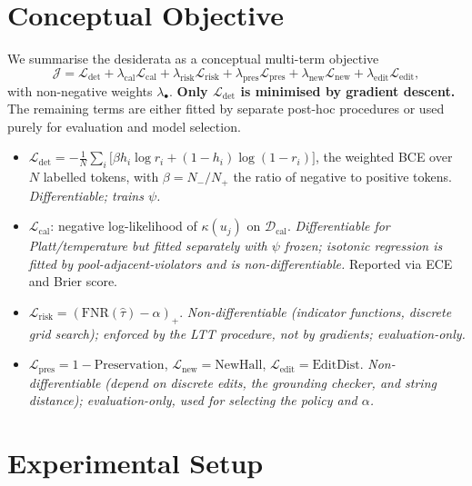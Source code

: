 \documentclass[11pt]{article}
\begin{document}
\section{Conceptual Objective}
\label{sec:loss}
We summarise the desiderata as a conceptual multi-term objective
\begin{equation}
\mathcal J = \mathcal L_{\text{det}} + \lambda_{\text{cal}}\mathcal L_{\text{cal}} + \lambda_{\text{risk}}\mathcal L_{\text{risk}} + \lambda_{\text{pres}}\mathcal L_{\text{pres}} + \lambda_{\text{new}}\mathcal L_{\text{new}} + \lambda_{\text{edit}}\mathcal L_{\text{edit}},
\end{equation}
with non-negative weights $\lambda_\bullet$. \textbf{Only $\mathcal L_{\text{det}}$ is minimised by gradient descent.} The remaining terms are either fitted by separate post-hoc procedures or used purely for evaluation and model selection.
\begin{itemize}
\item $\mathcal L_{\text{det}} = -\frac{1}{N}\sum_i \big[\beta h_i\log r_i + (1-h_i)\log(1-r_i)\big]$, the weighted BCE over $N$ labelled tokens, with $\beta = N_-/N_+$ the ratio of negative to positive tokens. \emph{Differentiable; trains $\psi$.}
\item $\mathcal L_{\text{cal}}$: negative log-likelihood of $\kappa(u_j)$ on $\mathcal D_{\text{cal}}$. \emph{Differentiable for Platt/temperature but fitted separately with $\psi$ frozen; isotonic regression is fitted by pool-adjacent-violators and is non-differentiable.} Reported via ECE and Brier score.
\item $\mathcal L_{\text{risk}} = (\mathrm{FNR}(\hat\tau)-\alpha)_+$. \emph{Non-differentiable (indicator functions, discrete grid search); enforced by the LTT procedure, not by gradients; evaluation-only.}
\item $\mathcal L_{\text{pres}} = 1-\text{Preservation}$, $\mathcal L_{\text{new}} = \text{NewHall}$, $\mathcal L_{\text{edit}} = \text{EditDist}$. \emph{Non-differentiable (depend on discrete edits, the grounding checker, and string distance); evaluation-only, used for selecting the policy and $\alpha$.}
\end{itemize}

\section{Experimental Setup}
\label{sec:setup}
\end{document}
